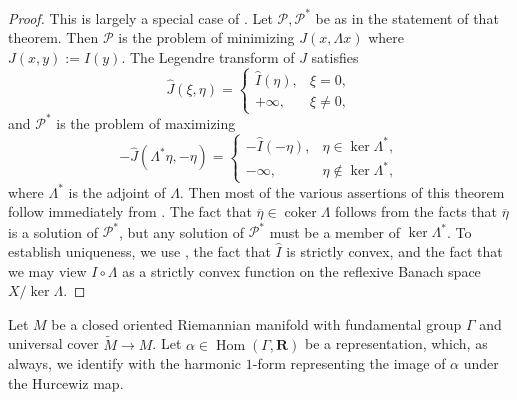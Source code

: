 \documentclass[reqno,11pt]{amsart}
\newcommand{\RR}{\mathbf{R}}
\DeclareMathOperator{\Hom}{Hom}
\DeclareMathOperator{\coker}{coker}
\theoremstyle{definition}
\numberwithin{equation}{section}
\begin{document}
\begin{proof}
This is largely a special case of \cite[Chapter IV, Theorem 4.2]{Ekeland99}.
Let $\mathscr P, \mathscr P^*$ be as in the statement of that theorem.
Then $\mathscr P$ is the problem of minimizing $J(x, \Lambda x)$ where $J(x, y) := I(y)$.
The Legendre transform of $J$ satisfies 
$$\hat J(\xi, \eta) = \begin{cases} \hat I(\eta), & \xi = 0, \\
	+\infty, &\xi \neq 0,
\end{cases}$$
and $\mathscr P^*$ is the problem of maximizing
$$-\hat J(\Lambda^* \eta, -\eta) = \begin{cases}
	-\hat I(-\eta), &\eta \in \ker \Lambda^*, \\
	-\infty, &\eta \notin \ker \Lambda^*,
\end{cases}$$
where $\Lambda^*$ is the adjoint of $\Lambda$.
Then most of the various assertions of this theorem follow immediately from \cite[Chapter IV, Theorem 4.2]{Ekeland99}.
The fact that $\overline \eta \in \coker \Lambda$ follows from the facts that $\overline \eta$ is a solution of $\mathscr P^*$, but any solution of $\mathscr P^*$ must be a member of $\ker \Lambda^*$. 
To establish uniqueness, we use \cite[Chapter II, Proposition 1.2]{Ekeland99}, the fact that $\hat I$ is strictly convex, and the fact that we may view $I \circ \Lambda$ as a strictly convex function on the reflexive Banach space $X/\ker \Lambda$.
\end{proof}

Let $M$ be a closed oriented Riemannian manifold with fundamental group $\Gamma$ and universal cover $\tilde M \to M$.
Let $\alpha \in \Hom(\Gamma, \RR)$ be a representation, which, as always, we identify with the harmonic $1$-form representing the image of $\alpha$ under the Hurcewiz map.
\end{document}

